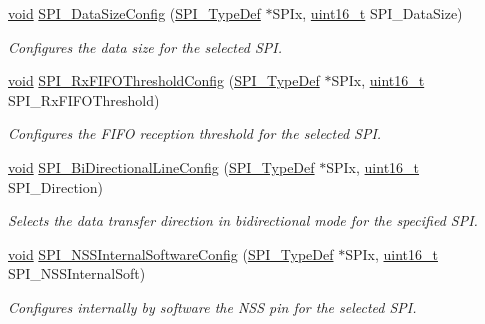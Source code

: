 \begin{DoxyCompactItemize}
\hyperlink{group___n_a_m_e_ga18028b8badbf1ea7e704ccac3c488e82}{void} \hyperlink{group___s_p_i___group1_gafc82e90841d7879535d655c035709cb1}{S\-P\-I\-\_\-\-Data\-Size\-Config} (\hyperlink{struct_s_p_i___type_def}{S\-P\-I\-\_\-\-Type\-Def} $\ast$S\-P\-Ix, \hyperlink{stdint_8h_a273cf69d639a59973b6019625df33e30}{uint16\-\_\-t} S\-P\-I\-\_\-\-Data\-Size)
\begin{DoxyCompactList}\small\item\em Configures the data size for the selected S\-P\-I. \end{DoxyCompactList}\item 
\hyperlink{group___n_a_m_e_ga18028b8badbf1ea7e704ccac3c488e82}{void} \hyperlink{group___s_p_i___group1_gadf3cde1aa75f099b3a42d6b18c6b5cf6}{S\-P\-I\-\_\-\-Rx\-F\-I\-F\-O\-Threshold\-Config} (\hyperlink{struct_s_p_i___type_def}{S\-P\-I\-\_\-\-Type\-Def} $\ast$S\-P\-Ix, \hyperlink{stdint_8h_a273cf69d639a59973b6019625df33e30}{uint16\-\_\-t} S\-P\-I\-\_\-\-Rx\-F\-I\-F\-O\-Threshold)
\begin{DoxyCompactList}\small\item\em Configures the F\-I\-F\-O reception threshold for the selected S\-P\-I. \end{DoxyCompactList}\item 
\hyperlink{group___n_a_m_e_ga18028b8badbf1ea7e704ccac3c488e82}{void} \hyperlink{group___s_p_i___group1_ga166171c421fc51da7714723524d41b45}{S\-P\-I\-\_\-\-Bi\-Directional\-Line\-Config} (\hyperlink{struct_s_p_i___type_def}{S\-P\-I\-\_\-\-Type\-Def} $\ast$S\-P\-Ix, \hyperlink{stdint_8h_a273cf69d639a59973b6019625df33e30}{uint16\-\_\-t} S\-P\-I\-\_\-\-Direction)
\begin{DoxyCompactList}\small\item\em Selects the data transfer direction in bidirectional mode for the specified S\-P\-I. \end{DoxyCompactList}\item 
\hyperlink{group___n_a_m_e_ga18028b8badbf1ea7e704ccac3c488e82}{void} \hyperlink{group___s_p_i___group1_ga56fc508a482f032f9eb80e4c63184126}{S\-P\-I\-\_\-\-N\-S\-S\-Internal\-Software\-Config} (\hyperlink{struct_s_p_i___type_def}{S\-P\-I\-\_\-\-Type\-Def} $\ast$S\-P\-Ix, \hyperlink{stdint_8h_a273cf69d639a59973b6019625df33e30}{uint16\-\_\-t} S\-P\-I\-\_\-\-N\-S\-S\-Internal\-Soft)
\begin{DoxyCompactList}\small\item\em Configures internally by software the N\-S\-S pin for the selected S\-P\-I. \end{DoxyCompactList}\item 

\end{DoxyCompactItemize}
